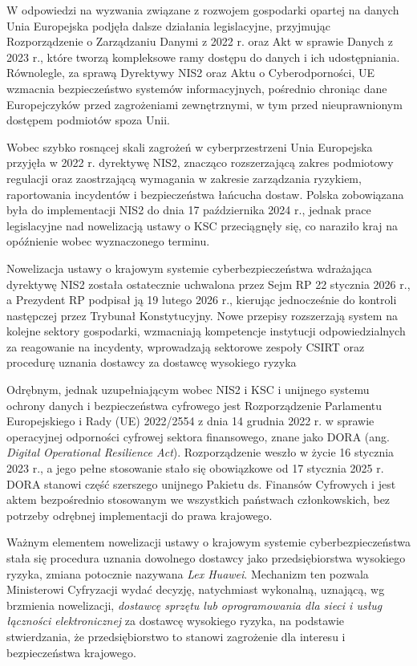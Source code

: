 \documentclass[12pt,a4paper,oneside]{book}
\begin{document}
W odpowiedzi na wyzwania związane z rozwojem gospodarki opartej na danych Unia Europejska podjęła dalsze działania legislacyjne, przyjmując Rozporządzenie o Zarządzaniu Danymi z 2022 r. oraz Akt w sprawie Danych z 2023 r., które tworzą kompleksowe ramy dostępu do danych i ich udostępniania. Równolegle, za sprawą Dyrektywy NIS2 oraz Aktu o Cyberodporności, UE wzmacnia bezpieczeństwo systemów informacyjnych, pośrednio chroniąc dane Europejczyków przed zagrożeniami zewnętrznymi, w tym przed nieuprawnionym dostępem podmiotów spoza Unii.

Wobec szybko rosnącej skali zagrożeń w cyberprzestrzeni Unia Europejska przyjęła w 2022 r. dyrektywę NIS2, znacząco rozszerzającą zakres podmiotowy regulacji oraz zaostrzającą wymagania w zakresie zarządzania ryzykiem, raportowania incydentów i bezpieczeństwa łańcucha dostaw. Polska zobowiązana była do implementacji NIS2 do dnia 17 października 2024 r., jednak prace legislacyjne nad nowelizacją ustawy o KSC przeciągnęły się, co naraziło kraj na opóźnienie wobec wyznaczonego terminu.

Nowelizacja ustawy o krajowym systemie cyberbezpieczeństwa wdrażająca dyrektywę NIS2 została ostatecznie uchwalona przez Sejm RP 22 stycznia 2026 r., a Prezydent RP podpisał ją 19 lutego 2026 r., kierując jednocześnie do kontroli następczej przez Trybunał Konstytucyjny. Nowe przepisy rozszerzają system na kolejne sektory gospodarki, wzmacniają kompetencje instytucji odpowiedzialnych za reagowanie na incydenty, wprowadzają sektorowe zespoły CSIRT oraz procedurę uznania dostawcy za dostawcę wysokiego ryzyka

Odrębnym, jednak uzupełniającym wobec NIS2 i KSC i unijnego systemu ochrony danych i bezpieczeństwa cyfrowego jest Rozporządzenie Parlamentu Europejskiego i Rady (UE) 2022/2554 z dnia 14 grudnia 2022 r. w sprawie operacyjnej odporności cyfrowej sektora finansowego,  znane jako DORA (ang. \textit{Digital Operational Resilience Act}). Rozporządzenie weszło w życie 16 stycznia 2023 r., a jego pełne stosowanie stało się obowiązkowe od 17 stycznia 2025 r. DORA stanowi część szerszego unijnego Pakietu ds. Finansów Cyfrowych i jest aktem bezpośrednio stosowanym we wszystkich państwach członkowskich, bez potrzeby odrębnej implementacji do prawa krajowego.

Ważnym elementem nowelizacji ustawy o krajowym systemie cyberbezpieczeństwa stała się procedura uznania dowolnego dostawcy jako przedsiębiorstwa wysokiego ryzyka, zmiana potocznie nazywana \textit{Lex Huawei}. Mechanizm ten pozwala Ministerowi Cyfryzacji wydać decyzję, natychmiast wykonalną, uznającą, wg brzmienia nowelizacji, \textit{dostawcę sprzętu lub oprogramowania dla sieci i usług łączności elektronicznej} za dostawcę wysokiego ryzyka, na podstawie stwierdzania, że przedsiębiorstwo to stanowi zagrożenie dla interesu i bezpieczeństwa krajowego. 
\end{document}
